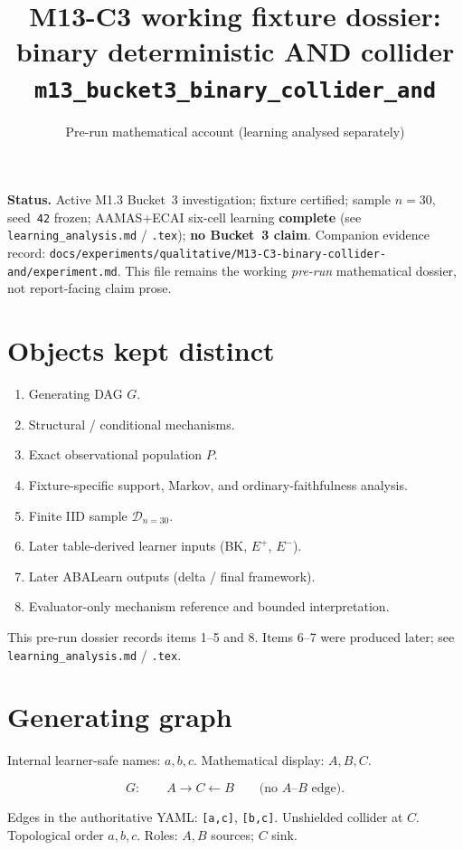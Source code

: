 \documentclass[11pt]{article}
\title{M13-C3 working fixture dossier:\\
binary deterministic AND collider\\
\texttt{m13\_bucket3\_binary\_collider\_and}}
\author{}
\date{Pre-run mathematical account (learning analysed separately)}
\begin{document}
\maketitle

\noindent\textbf{Status.} Active M1.3 Bucket~3 investigation; fixture certified;
sample \(n{=}30\), seed~\texttt{42} frozen; AAMAS+ECAI six-cell learning
\textbf{complete} (see \texttt{learning\_analysis.md} / \texttt{.tex});
\textbf{no Bucket~3 claim}.
Companion evidence record:
\texttt{docs/experiments/qualitative/M13-C3-binary-collider-and/experiment.md}.
This file remains the working \emph{pre-run} mathematical dossier, not
report-facing claim prose.

\section{Objects kept distinct}

\begin{enumerate}
  \item Generating DAG \(G\).
  \item Structural / conditional mechanisms.
  \item Exact observational population \(P\).
  \item Fixture-specific support, Markov, and ordinary-faithfulness analysis.
  \item Finite IID sample \(\mathcal{D}_{n{=}30}\).
  \item Later table-derived learner inputs (BK, \(E^+\), \(E^-\)).
  \item Later ABALearn outputs (delta / final framework).
  \item Evaluator-only mechanism reference and bounded interpretation.
\end{enumerate}
This pre-run dossier records items 1--5 and 8. Items 6--7 were produced later;
see \texttt{learning\_analysis.md} / \texttt{.tex}.

\section{Generating graph}

Internal learner-safe names: \(a,b,c\). Mathematical display: \(A,B,C\).

\[
G:\qquad A \rightarrow C \leftarrow B
\qquad\text{(no \(A\)--\(B\) edge).}
\]

Edges in the authoritative YAML:
\texttt{[a,c]}, \texttt{[b,c]}.
Unshielded collider at \(C\). Topological order \(a,b,c\).
Roles: \(A,B\) sources; \(C\) sink.
\end{document}
